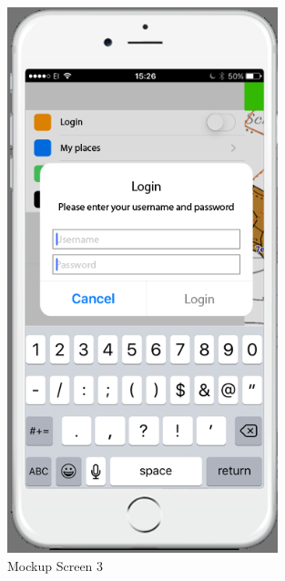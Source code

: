 \begin{figure}[H]
\centering
    \includegraphics[width=0.7\textwidth]{mockup1-3}
    \caption{Mockup Screen 3}
    \label{fig:mesh3}
\end{figure}

